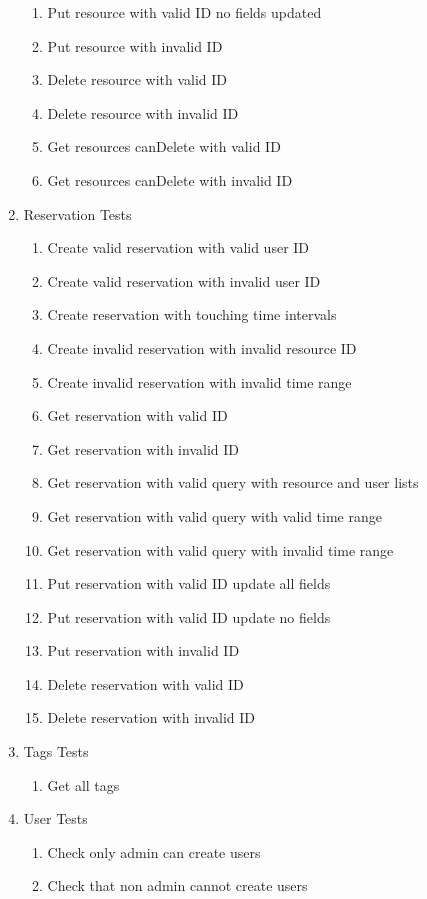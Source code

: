 \documentclass[12pt]{article}
\begin{document}
\begin{enumerate}
\begin{enumerate}
		\item Put resource with valid ID no fields updated
		\item Put resource with invalid ID
		\item Delete resource with valid ID
		\item Delete resource with invalid ID
		\item Get resources canDelete with valid ID
		\item Get resources canDelete with invalid ID
	\end{enumerate}
	\item Reservation Tests
	\begin{enumerate}
		\item Create valid reservation with valid user ID
		\item Create valid reservation with invalid user ID
		\item Create reservation with touching time intervals
		\item Create invalid reservation with invalid resource ID
		\item Create invalid reservation with invalid time range
		\item Get reservation with valid ID
		\item Get reservation with invalid ID
		\item Get reservation with valid query with resource and user lists
		\item Get reservation with valid query with valid time range
		\item Get reservation with valid query with invalid time range
		\item Put reservation with valid ID update all fields
		\item Put reservation with valid ID update no fields
		\item Put reservation with invalid ID
		\item Delete reservation with valid ID
		\item Delete reservation with invalid ID
	\end{enumerate}
	\item Tags Tests
	\begin{enumerate}
		\item Get all tags
	\end{enumerate}
	\item User Tests
	\begin{enumerate}
		\item Check only admin can create users
		\item Check that non admin cannot create users

\end{enumerate}
\end{enumerate}
\end{document}
